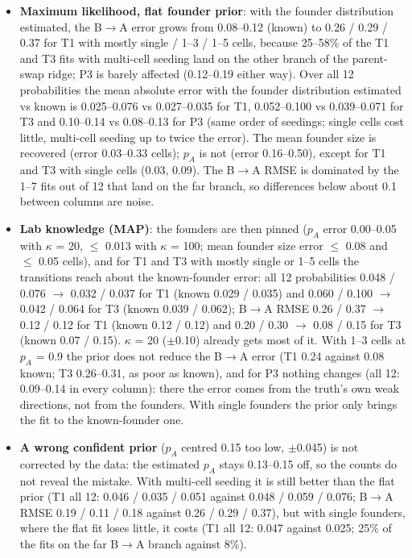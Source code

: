 \documentclass[10pt,a4paper]{article}
\newcommand{\BA}{B$\to$A}
\begin{document}
\begin{itemize}
\item \textbf{Maximum likelihood, flat founder prior}: with the founder distribution estimated, the \BA{} error grows from 0.08--0.12 (known) to 0.26 / 0.29 / 0.37 for T1 with mostly single / 1--3 / 1--5 cells, because 25--58\% of the T1 and T3 fits with multi-cell seeding land on the other branch of the parent-swap ridge; P3 is barely affected (0.12--0.19 either way). Over all 12 probabilities the mean absolute error with the founder distribution estimated vs known is 0.025--0.076 vs 0.027--0.035 for T1, 0.052--0.100 vs 0.039--0.071 for T3 and 0.10--0.14 vs 0.08--0.13 for P3 (same order of seedings; single cells cost little, multi-cell seeding up to twice the error). The mean founder size is recovered (error 0.03--0.33 cells); $p_A$ is not (error 0.16--0.50), except for T1 and T3 with single cells (0.03, 0.09). The \BA{} RMSE is dominated by the 1--7 fits out of 12 that land on the far branch, so differences below about 0.1 between columns are noise.
\item \textbf{Lab knowledge (MAP)}: the founders are then pinned ($p_A$ error 0.00--0.05 with $\kappa$ = 20, $\le$ 0.013 with $\kappa$ = 100; mean founder size error $\le$ 0.08 and $\le$ 0.05 cells), and for T1 and T3 with mostly single or 1--5 cells the transitions reach about the known-founder error: all 12 probabilities 0.048 / 0.076 $\to$ 0.032 / 0.037 for T1 (known 0.029 / 0.035) and 0.060 / 0.100 $\to$ 0.042 / 0.064 for T3 (known 0.039 / 0.062); \BA{} RMSE 0.26 / 0.37 $\to$ 0.12 / 0.12 for T1 (known 0.12 / 0.12) and 0.20 / 0.30 $\to$ 0.08 / 0.15 for T3 (known 0.07 / 0.15). $\kappa$ = 20 ($\pm$0.10) already gets most of it. With 1--3 cells at $p_A$ = 0.9 the prior does not reduce the \BA{} error (T1 0.24 against 0.08 known; T3 0.26--0.31, as poor as known), and for P3 nothing changes (all 12: 0.09--0.14 in every column): there the error comes from the truth's own weak directions, not from the founders. With single founders the prior only brings the fit to the known-founder one.
\item \textbf{A wrong confident prior} ($p_A$ centred 0.15 too low, $\pm$0.045) is not corrected by the data: the estimated $p_A$ stays 0.13--0.15 off, so the counts do not reveal the mistake. With multi-cell seeding it is still better than the flat prior (T1 all 12: 0.046 / 0.035 / 0.051 against 0.048 / 0.059 / 0.076; \BA{} RMSE 0.19 / 0.11 / 0.18 against 0.26 / 0.29 / 0.37), but with single founders, where the flat fit loses little, it costs (T1 all 12: 0.047 against 0.025; 25\% of the fits on the far \BA{} branch against 8\%).

\end{itemize}
\end{document}
